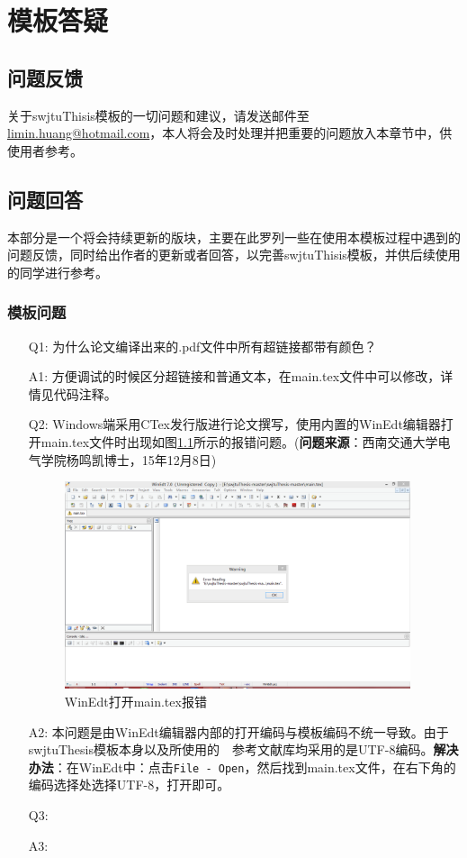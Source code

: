 \chapter{模板答疑}

\section{问题反馈}
\label{sec:contact}
关于swjtuThisis模板的一切问题和建议，请发送邮件至\href{mailto:limin.huang@hotmail.com}{limin.huang@hotmail.com}，本人将会及时处理并把重要的问题放入本章节中，供使用者参考。

\section{问题回答}
本部分是一个将会持续更新的版块，主要在此罗列一些在使用本模板过程中遇到的问题反馈，同时给出作者的更新或者回答，以完善swjtuThisis模板，并供后续使用的同学进行参考。

\subsection{模板问题}
\begin{enumerate}
	\item[Q1:]为什么论文编译出来的.pdf文件中所有超链接都带有颜色？
	\item[A1:]方便调试的时候区分超链接和普通文本，在main.tex文件中可以修改，详情见代码注释。
	\item[Q2:]Windows端采用CTex发行版进行论文撰写，使用内置的WinEdt编辑器打开main.tex文件时出现如图\ref{Q151208_1_Yang}所示的报错问题。(\textbf{问题来源}：西南交通大学电气学院杨鸣凯博士，15年12月8日)
	\begin{figure}[htbp]
		\centering
		\includegraphics[width=4in]{figures/QA/Q151208_1_Yang.png}
		\caption{WinEdt打开main.tex报错}
		\label{Q151208_1_Yang}
	\end{figure}
	\item[A2:]本问题是由WinEdt编辑器内部的打开编码与模板编码不统一导致。由于swjtuThesis模板本身以及所使用的~\BibTeX{}~参考文献库均采用的是UTF-8编码。\textbf{解决办法}：在WinEdt中：点击\verb|File - Open|，然后找到main.tex文件，在右下角的编码选择处选择UTF-8，打开即可。
	\item[Q3:]
	\item[A3:]
\end{enumerate}

